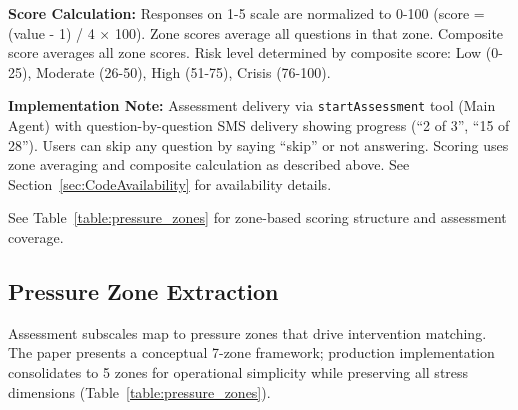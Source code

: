 \documentclass{article}
\begin{document}
\textbf{Score Calculation:} Responses on 1-5 scale are normalized to 0-100 (score = (value - 1) / 4 × 100). Zone scores average all questions in that zone. Composite score averages all zone scores. Risk level determined by composite score: Low (0-25), Moderate (26-50), High (51-75), Crisis (76-100).

\textbf{Implementation Note:} Assessment delivery via \texttt{startAssessment} tool (Main Agent) with question-by-question SMS delivery showing progress (``2 of 3'', ``15 of 28''). Users can skip any question by saying ``skip'' or not answering. Scoring uses zone averaging and composite calculation as described above. See Section~\ref{sec:CodeAvailability} for availability details.

See Table~\ref{table:pressure_zones} for zone-based scoring structure and assessment coverage.

%
\subsection{Pressure Zone Extraction}%
\label{subsec:PressureZoneExtraction}%
Assessment subscales map to pressure zones that drive intervention matching. The paper presents a conceptual 7-zone framework; production implementation consolidates to 5 zones for operational simplicity while preserving all stress dimensions (Table~\ref{table:pressure_zones}).
\end{document}

